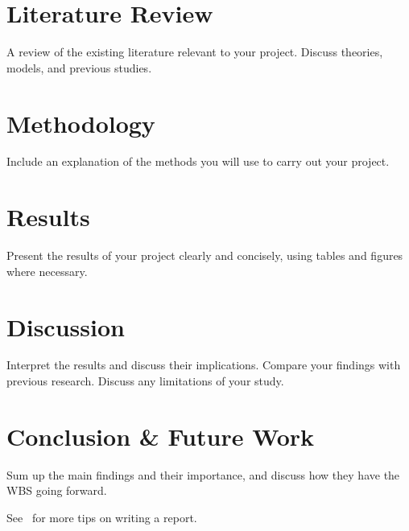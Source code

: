 \documentclass[11pt,twoside,a4paper]{report}
\begin{document}
\chapter{Literature Review}
A review of the existing literature relevant to your project. Discuss theories, models, and previous studies.
\chapter{Methodology}
Include an explanation of the methods you will use to carry out your project.
\chapter{Results}
Present the results of your project clearly and concisely, using tables and figures where necessary.
\chapter{Discussion}
Interpret the results and discuss their implications.
Compare your findings with previous research.
Discuss any limitations of your study.
\chapter{Conclusion \& Future Work}
Sum up the main findings and their importance, and discuss how they have the WBS going forward.

See~\cite{Joshua2012} for more tips on writing a report.




\end{document}
